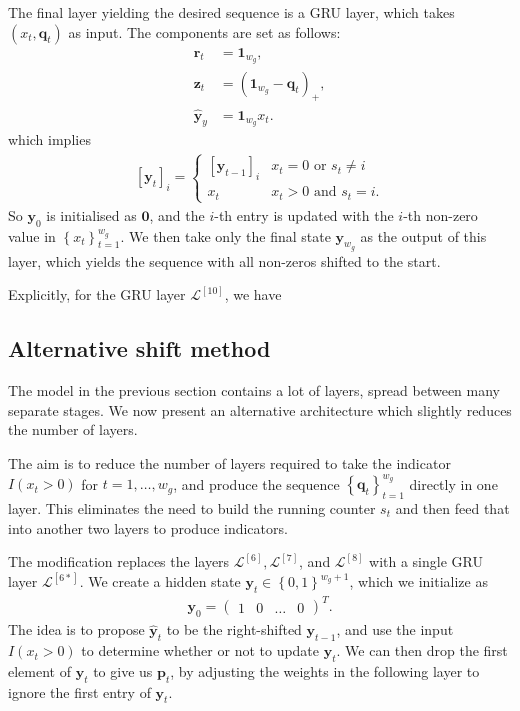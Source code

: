 \documentclass{somasmsc}
\begin{document}
The final layer yielding the desired sequence is a GRU layer, which takes $\left(x_t, \pmb{q}_t\right)$ as input. The components are set as follows:
\begin{align*}
\pmb{r}_t &= \mathbf{1}_{w_g}, \\
\pmb{z}_t &= \left(\mathbf{1}_{w_g} - \pmb{q}_t\right)_+, \\
\hat{\pmb{y}}_y &= \mathbf{1}_{w_g} x_t.
\end{align*}
which implies
\begin{align*}
\left[\pmb{y}_t\right]_i =
\begin{cases}
    \left[\pmb{y}_{t-1}\right]_i & x_t = 0 \text{ or } s_t \neq i \\
    x_t & x_t > 0 \text{ and } s_t = i.
\end{cases}
\end{align*}
So $\pmb{y}_0$ is initialised as $\mathbf{0}$, and the $i$-th entry is updated with the $i$-th non-zero value in $\left\{x_t\right\}_{t=1}^{w_g}$. We then take only the final state $\pmb{y}_{w_g}$ as the output of this layer, which yields the sequence with all non-zeros shifted to the start.

Explicitly, for the GRU layer $\mathcal{L}^{\left[10\right]}$, we have


\subsection{Alternative shift method}\label{letters:alt}

The model in the previous section contains a lot of layers, spread between many separate stages. We now present an alternative architecture which slightly reduces the number of layers.

The aim is to reduce the number of layers required to take the indicator $I\left(x_t > 0\right)$ for $t=1, \dots, w_g$, and produce the sequence $\left\{\pmb{q}_t\right\}_{t=1}^{w_g}$ directly in one layer. This eliminates the need to build the running counter $s_t$ and then feed that into another two layers to produce indicators.

The modification replaces the layers $\mathcal{L}^{\left[6\right]}, \mathcal{L}^{\left[7\right]}$, and $\mathcal{L}^{\left[8\right]}$ with a single GRU layer $\mathcal{L}^{\left[6*\right]}$. We create a hidden state $\pmb{y}_t \in \left\{0, 1\right\}^{w_g+1}$, which we initialize as
\begin{align*}
\pmb{y}_0 =
\begin{pmatrix}
    1 & 0 & \dots & 0
\end{pmatrix}^T.
\end{align*}
The idea is to propose $\hat{\pmb{y}}_t$ to be the right-shifted $\pmb{y}_{t-1}$, and use the input $I\left(x_t > 0\right)$ to determine whether or not to update $\pmb{y}_t$. We can then drop the first element of $\pmb{y}_t$ to give us $\pmb{p}_t$, by adjusting the weights in the following layer to ignore the first entry of $\pmb{y}_t$.
\end{document}
